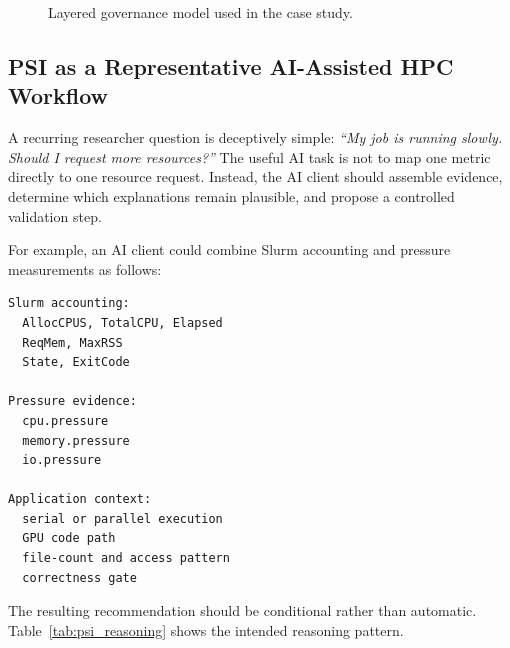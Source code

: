 \documentclass[11pt]{article}
\begin{document}
\begin{figure}[H]
\centering
{}
\caption{Layered governance model used in the case study.}
\end{figure}

\subsection{PSI as a Representative AI-Assisted HPC Workflow}

A recurring researcher question is deceptively simple: \emph{``My job is running slowly. Should I request more resources?''} The useful AI task is not to map one metric directly to one resource request. Instead, the AI client should assemble evidence, determine which explanations remain plausible, and propose a controlled validation step.

For example, an AI client could combine Slurm accounting and pressure measurements as follows:

\begin{lstlisting}
Slurm accounting:
  AllocCPUS, TotalCPU, Elapsed
  ReqMem, MaxRSS
  State, ExitCode

Pressure evidence:
  cpu.pressure
  memory.pressure
  io.pressure

Application context:
  serial or parallel execution
  GPU code path
  file-count and access pattern
  correctness gate
\end{lstlisting}

The resulting recommendation should be conditional rather than automatic. Table~\ref{tab:psi_reasoning} shows the intended reasoning pattern.
\end{document}
